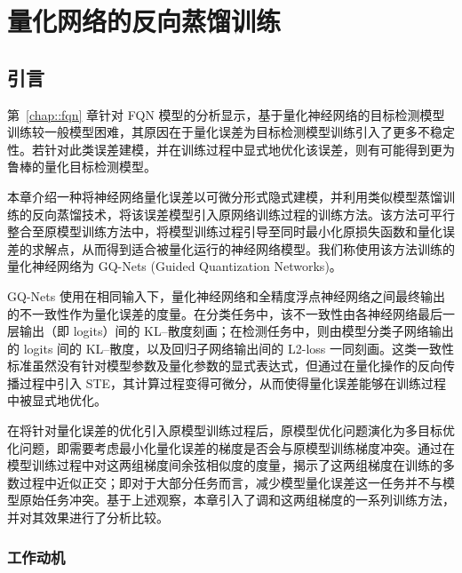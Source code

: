 \chapter{量化网络的反向蒸馏训练} \label{chap::gq_nets}
\section{引言}
第~\ref{chap::fqn} 章针对 FQN 模型的分析显示，基于量化神经网络的目标检测模型训练较一般模型困难，其原因在于量化误差为目标检测模型训练引入了更多不稳定性。若针对此类误差建模，并在训练过程中显式地优化该误差，则有可能得到更为鲁棒的量化目标检测模型。

本章介绍一种将神经网络量化误差以可微分形式隐式建模，并利用类似模型蒸馏训练的反向蒸馏技术，将该误差模型引入原网络训练过程的训练方法。该方法可平行整合至原模型训练方法中，将模型训练过程引导至同时最小化原损失函数和量化误差的求解点，从而得到适合被量化运行的神经网络模型。我们称使用该方法训练的量化神经网络为 GQ-Nets (Guided Quantization Networks)。

GQ-Nets 使用在相同输入下，量化神经网络和全精度浮点神经网络之间最终输出的不一致性作为量化误差的度量。在分类任务中，该不一致性由各神经网络最后一层输出（即 logits）间的 KL--散度刻画；在检测任务中，则由模型分类子网络输出的 logits 间的 KL--散度，以及回归子网络输出间的 L2-loss 一同刻画。这类一致性标准虽然没有针对模型参数及量化参数的显式表达式，但通过在量化操作的反向传播过程中引入 STE，其计算过程变得可微分，从而使得量化误差能够在训练过程中被显式地优化。

在将针对量化误差的优化引入原模型训练过程后，原模型优化问题演化为多目标优化问题，即需要考虑最小化量化误差的梯度是否会与原模型训练梯度冲突。通过在模型训练过程中对这两组梯度间余弦相似度的度量，揭示了这两组梯度在训练的多数过程中近似正交；即对于大部分任务而言，减少模型量化误差这一任务并不与模型原始任务冲突。基于上述观察，本章引入了调和这两组梯度的一系列训练方法，并对其效果进行了分析比较。
\subsection{工作动机}

